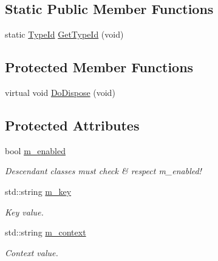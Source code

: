 \subsection*{Static Public Member Functions}
\begin{DoxyCompactItemize}
\item 
static \hyperlink{classns3_1_1TypeId}{Type\+Id} \hyperlink{classns3_1_1DataCalculator_aebaa221bf6e8766c385892f8d828dc65}{Get\+Type\+Id} (void)
\end{DoxyCompactItemize}
\subsection*{Protected Member Functions}
\begin{DoxyCompactItemize}
\item 
virtual void \hyperlink{classns3_1_1DataCalculator_ab131de1ac0b2259992b1aeaca778c75b}{Do\+Dispose} (void)
\end{DoxyCompactItemize}
\subsection*{Protected Attributes}
\begin{DoxyCompactItemize}
\item 
bool \hyperlink{classns3_1_1DataCalculator_a718610677986a6dd72ce23567b792376}{m\+\_\+enabled}
\begin{DoxyCompactList}\small\item\em Descendant classes {\itshape must} check \& respect m\+\_\+enabled! \end{DoxyCompactList}\item 
std\+::string \hyperlink{classns3_1_1DataCalculator_a959fc95c9bfea5e4881443b9f419cf67}{m\+\_\+key}
\begin{DoxyCompactList}\small\item\em Key value. \end{DoxyCompactList}\item 
std\+::string \hyperlink{classns3_1_1DataCalculator_a911a3c6dfa509e8844f899ddd14e06c0}{m\+\_\+context}
\begin{DoxyCompactList}\small\item\em Context value. \end{DoxyCompactList}\end{DoxyCompactItemize}
